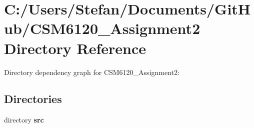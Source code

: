 \section{C\+:/\+Users/\+Stefan/\+Documents/\+Git\+Hub/\+C\+S\+M6120\+\_\+\+Assignment2 Directory Reference}
\label{dir_8c03731c8cac265e3b3d630c8ca6917f}
Directory dependency graph for C\+S\+M6120\+\_\+\+Assignment2\+:
\subsection*{Directories}
\begin{DoxyCompactItemize}
\item 
directory {\bf src}
\end{DoxyCompactItemize}
